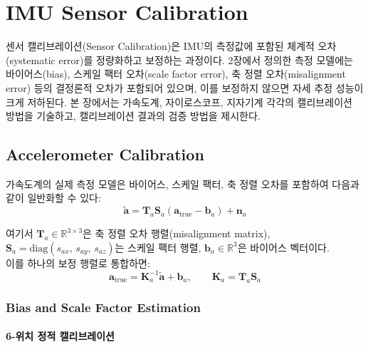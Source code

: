 \section{IMU Sensor Calibration}
    센서 캘리브레이션(Sensor Calibration)은 IMU의 측정값에 포함된 체계적 오차(systematic error)를 정량화하고 보정하는 과정이다. 2장에서 정의한 측정 모델에는 바이어스(bias), 스케일 팩터 오차(scale factor error), 축 정렬 오차(misalignment error) 등의 결정론적 오차가 포함되어 있으며, 이를 보정하지 않으면 자세 추정 성능이 크게 저하된다. 본 장에서는 가속도계, 자이로스코프, 지자기계 각각의 캘리브레이션 방법을 기술하고, 캘리브레이션 결과의 검증 방법을 제시한다.\\

    \subsection{Accelerometer Calibration}
        가속도계의 실제 측정 모델은 바이어스, 스케일 팩터, 축 정렬 오차를 포함하여 다음과 같이 일반화할 수 있다:\\

        \begin{equation}
            \tilde{\mathbf{a}} = \mathbf{T}_a \mathbf{S}_a \left( \mathbf{a}_{\text{true}} - \mathbf{b}_a \right) + \mathbf{n}_a
            \label{eq:accel_full_model}
        \end{equation}

        \noindent 여기서 $\mathbf{T}_a \in \mathbb{R}^{3\times 3}$은 축 정렬 오차 행렬(misalignment matrix), $\mathbf{S}_a = \text{diag}(s_{ax},\, s_{ay},\, s_{az})$는 스케일 팩터 행렬, $\mathbf{b}_a \in \mathbb{R}^3$은 바이어스 벡터이다.\\

        이를 하나의 보정 행렬로 통합하면:\\

        \begin{equation}
            \mathbf{a}_{\text{true}} = \mathbf{K}_a^{-1} \tilde{\mathbf{a}} + \mathbf{b}_a, \qquad \mathbf{K}_a = \mathbf{T}_a \mathbf{S}_a
            \label{eq:accel_calib_matrix}
        \end{equation}

        \subsubsection{Bias and Scale Factor Estimation}
            \paragraph{6-위치 정적 캘리브레이션}

